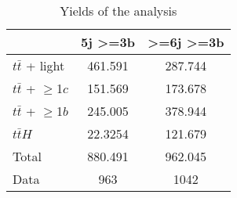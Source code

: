 \documentclass[10pt]{article}
\begin{document}
\begin{table}[htbp]
\begin{center}
\begin{tabular}{|l|S|S|}
\hline 
 & {5j >=3b} & {>=6j >=3b}\\
\hline 
  $t\bar{t}$ + light   & 461.591  & 287.744  \\ 
  $t\bar{t}$ + $\geq$1$c$   & 151.569  & 173.678  \\ 
  $t\bar{t}$ + $\geq$1$b$   & 245.005  & 378.944  \\ 
  $t\bar{t}H$   & 22.3254  & 121.679  \\ 
\hline 
  Total  & 880.491  & 962.045  \\ 
\hline 
  Data   & 963 & 1042 \\ 
\hline 
\end{tabular} 
\caption{Yields of the analysis} 
\end{center} 
\end{table} 
\end{document}
